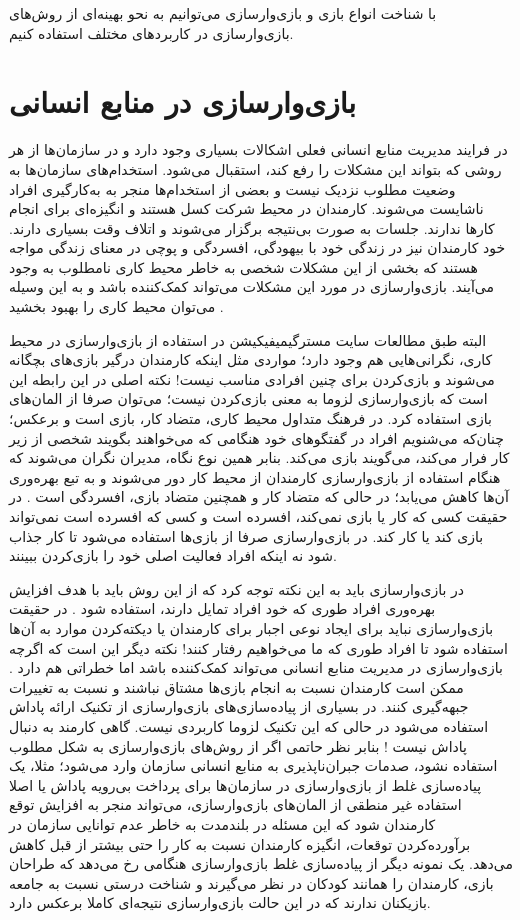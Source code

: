 با شناخت انواع بازی و بازی‌وارسازی می‌توانیم به نحو بهینه‌ای از روش‌های بازی‌وارسازی در کاربردهای مختلف استفاده کنیم.

\section{بازی‌وارسازی در منابع انسانی}
در فرایند مدیریت منابع انسانی فعلی اشکالات بسیاری وجود دارد و در سازمان‌ها از هر روشی که بتواند این مشکلات را رفع کند، استقبال می‌شود. استخدام‌های سازمان‌ها به وضعیت مطلوب نزدیک نیست و بعضی از استخدام‌ها منجر به به‌کارگیری افراد ناشایست می‌شوند. کارمندان در محیط شرکت کسل هستند و انگیزه‌ای برای انجام کارها ندارند. جلسات به صورت بی‌نتیجه برگزار می‌شوند و اتلاف وقت بسیاری دارند. خود کارمندان نیز در زندگی خود با بیهودگی، افسردگی و پوچی در معنای زندگی مواجه هستند که بخشی از این مشکلات شخصی به خاطر محیط کاری نامطلوب به وجود می‌آیند. بازی‌وارسازی در مورد این مشکلات می‌تواند کمک‌کننده باشد و به این وسیله می‌توان محیط کاری را بهبود بخشید \cite{boudlaie}.

البته طبق مطالعات سایت مسترگیمیفیکیشن \cite{mrg} در استفاده از بازی‌وارسازی در محیط کاری، نگرانی‌هایی هم وجود دارد؛ مواردی مثل اینکه کارمندان درگیر بازی‌های بچگانه می‌شوند و بازی‌کردن برای چنین افرادی مناسب نیست! نکته اصلی در این رابطه این است که بازی‌وارسازی لزوما به معنی بازی‌کردن نیست؛ می‌توان صرفا از المان‌های بازی استفاده کرد. در فرهنگ متداول محیط کاری، متضاد کار، بازی است و برعکس؛ چنان‌که می‌شنویم افراد در گفتگوهای خود هنگامی که می‌خواهند بگویند شخصی از زیر کار فرار می‌کند، می‌گویند بازی می‌کند. بنابر همین نوع نگاه، مدیران نگران می‌شوند که هنگام استفاده از بازی‌وارسازی کارمندان از محیط کار دور می‌شوند و به تبع بهره‌وری آن‌ها کاهش می‌یابد؛ در حالی که متضاد کار و همچنین متضاد بازی، افسردگی است \cite{tedx}. در حقیقت کسی که کار یا بازی نمی‌کند، افسرده است و کسی که افسرده است نمی‌تواند بازی کند یا کار کند. در بازی‌وارسازی صرفا از بازی‌ها استفاده می‌شود تا کار جذاب شود نه اینکه افراد فعالیت اصلی خود را بازی‌کردن ببینند.

در بازی‌وارسازی باید به این نکته توجه کرد که از این روش باید با هدف افزایش بهره‌وری افراد طوری که خود افراد تمایل دارند، استفاده شود \cite{tedx}. در حقیقت بازی‌وارسازی نباید برای ایجاد نوعی اجبار برای کارمندان یا دیکته‌کردن موارد به آن‌ها استفاده شود تا افراد طوری که ما می‌خواهیم رفتار کنند!
نکته دیگر این است که اگرچه بازی‌وارسازی در مدیریت منابع انسانی می‌تواند کمک‌کننده باشد اما خطراتی هم دارد \cite{atoz}. ممکن است کارمندان نسبت به انجام بازی‌ها مشتاق نباشند و نسبت به تغییرات جبهه‌گیری کنند. در بسیاری از پیاده‌سازی‌های بازی‌وارسازی از تکنیک ارائه پاداش استفاده می‌شود در حالی که این تکنیک لزوما کاربردی نیست. گاهی کارمند به دنبال پاداش نیست \cite{mrg}! بنابر نظر حاتمی \cite{atoz} اگر از روش‌های بازی‌وارسازی به شکل مطلوب استفاده نشود، صدمات جبران‌ناپذیری به منابع انسانی سازمان وارد می‌شود؛ مثلا، یک پیاده‌سازی غلط از بازی‌وارسازی در سازمان‌ها برای پرداخت بی‌رویه پاداش یا اصلا استفاده غیر منطقی از المان‌های بازی‌وارسازی، می‌تواند منجر به افزایش توقع کارمندان شود که این مسئله در بلندمدت به خاطر عدم توانایی سازمان در برآورده‌کردن توقعات، انگیزه کارمندان نسبت به کار را حتی بیشتر از قبل کاهش می‌دهد. یک نمونه دیگر از پیاده‌سازی غلط بازی‌وارسازی هنگامی رخ می‌دهد که طراحان بازی، کارمندان را همانند کودکان در نظر می‌گیرند و شناخت درستی نسبت به جامعه بازیکنان ندارند که در این حالت بازی‌وارسازی نتیجه‌ای کاملا برعکس دارد.


